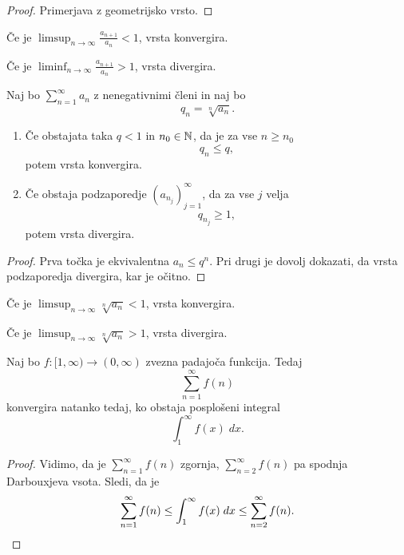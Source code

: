 \documentclass[12pt, a4paper]{article}
\begin{document}
\begin{proof}
Primerjava z geometrijsko vrsto.
\end{proof}

\begin{posledica}
Če je $\displaystyle\limsup_{n\to\infty}\frac{a_{n+1}}{a_n}<1$, vrsta konvergira.
\end{posledica}

\begin{posledica}
Če je $\displaystyle\liminf_{n\to\infty}\frac{a_{n+1}}{a_n}>1$, vrsta divergira.
\end{posledica}

\begin{izrek}
Naj bo $\displaystyle\sum_{n=1}^\infty a_n$ z nenegativnimi členi in naj bo
\[
q_n=\sqrt[n]{a_n}.
\]

\begin{enumerate}[label=\arabic*)]
\item Če obstajata taka $q<1$ in $n_0\in\mathbb{N}$, da je za vse $n\geq n_0$
\[
q_n\leq q,
\]
potem vrsta konvergira.
\item Če obstaja podzaporedje $(a_{n_j})_{j=1}^\infty$, da za vse $j$ velja
\[
q_{n_j}\geq 1,
\]
potem vrsta divergira.
\end{enumerate}
\end{izrek}

\begin{proof}
Prva točka je ekvivalentna $a_n\leq q^n$. Pri drugi je dovolj dokazati, da vrsta podzaporedja divergira, kar je očitno.
\end{proof}

\begin{posledica}
Če je $\displaystyle\limsup_{n\to\infty}\sqrt[n]{a_n}<1$, vrsta konvergira.
\end{posledica}

\begin{posledica}
Če je $\displaystyle\limsup_{n\to\infty}\sqrt[n]{a_n}>1$, vrsta divergira.
\end{posledica}

\begin{izrek}
Naj bo $f\colon[1,\infty)\to(0,\infty)$ zvezna padajoča funkcija. Tedaj
\[
\sum_{n=1}^\infty f(n)
\]
konvergira natanko tedaj, ko obstaja posplošeni integral
\[
\int_1^\infty f(x)\;dx.
\]
\end{izrek}

\begin{proof}
Vidimo, da je $\displaystyle\sum_{n=1}^\infty f(n)$ zgornja, $\displaystyle\sum_{n=2}^\infty f(n)$ pa spodnja Darbouxjeva vsota. Sledi, da je
\[
\sum_{n=1}^\infty f(n)\leq \int_1^\infty f(x)\;dx\leq \sum_{n=2}^\infty f(n).\qedhere
\]
\end{proof}
\end{document}
